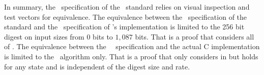 
In summary, the \cryptol\ specification of the \fips\ standard relies on visual inspection and test vectors for equivalence.
The equivalence between the \cryptol\ specification of the standard and the \cryptol\ specification of \openssl's implementation is limited to the 256 bit digest on input sizes from $0$ bits to $1,087$ bits.
That is a proof that considers all of .
The equivalence between the \openssl\ \cryptol\ specification and the actual C implementation is limited to the \keccak\ algorithm only.
That is a proof that only considers  in  but holds for any state and is independent of the digest size and rate.

